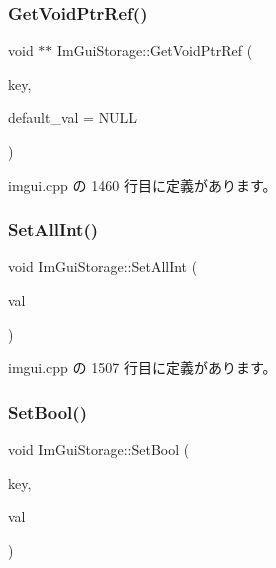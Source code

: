 \subsubsection{\texorpdfstring{Get\+Void\+Ptr\+Ref()}{GetVoidPtrRef()}}
{\footnotesize\ttfamily void $\ast$$\ast$ Im\+Gui\+Storage\+::\+Get\+Void\+Ptr\+Ref (\begin{DoxyParamCaption}\item[{\mbox{\hyperlink{imgui_8h_a1785c9b6f4e16406764a85f32582236f}{Im\+Gui\+ID}}}]{key,  }\item[{void $\ast$}]{default\+\_\+val = {\ttfamily NULL} }\end{DoxyParamCaption})}



 imgui.\+cpp の 1460 行目に定義があります。

\mbox{\label{struct_im_gui_storage_ae5ee60618c4ce8e2b4ce0e5543d52992}} 
\subsubsection{\texorpdfstring{Set\+All\+Int()}{SetAllInt()}}
{\footnotesize\ttfamily void Im\+Gui\+Storage\+::\+Set\+All\+Int (\begin{DoxyParamCaption}\item[{int}]{val }\end{DoxyParamCaption})}



 imgui.\+cpp の 1507 行目に定義があります。

\mbox{\label{struct_im_gui_storage_ac5beee31a59b3f5294b41992717be7bf}} 
\subsubsection{\texorpdfstring{Set\+Bool()}{SetBool()}}
{\footnotesize\ttfamily void Im\+Gui\+Storage\+::\+Set\+Bool (\begin{DoxyParamCaption}\item[{\mbox{\hyperlink{imgui_8h_a1785c9b6f4e16406764a85f32582236f}{Im\+Gui\+ID}}}]{key,  }\item[{bool}]{val }\end{DoxyParamCaption})}



